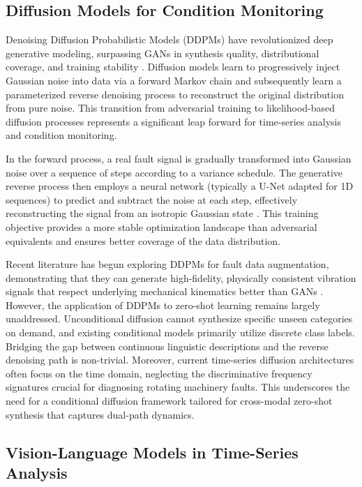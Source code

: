 \subsection{Diffusion Models for Condition Monitoring}

Denoising Diffusion Probabilistic Models (DDPMs) have revolutionized deep generative modeling, surpassing GANs in synthesis quality, distributional coverage, and training stability \cite{ho2020denoising}. Diffusion models learn to progressively inject Gaussian noise into data via a forward Markov chain and subsequently learn a parameterized reverse denoising process to reconstruct the original distribution from pure noise. This transition from adversarial training to likelihood-based diffusion processes represents a significant leap forward for time-series analysis and condition monitoring.

In the forward process, a real fault signal is gradually transformed into Gaussian noise over a sequence of steps according to a variance schedule. The generative reverse process then employs a neural network (typically a U-Net adapted for 1D sequences) to predict and subtract the noise at each step, effectively reconstructing the signal from an isotropic Gaussian state \cite{he2016deep,ho2020denoising}. This training objective provides a more stable optimization landscape than adversarial equivalents and ensures better coverage of the data distribution.

Recent literature has begun exploring DDPMs for fault data augmentation, demonstrating that they can generate high-fidelity, physically consistent vibration signals that respect underlying mechanical kinematics better than GANs \cite{fan2025lightweight,yang2024novel}. However, the application of DDPMs to zero-shot learning remains largely unaddressed. Unconditional diffusion cannot synthesize specific unseen categories on demand, and existing conditional models primarily utilize discrete class labels. Bridging the gap between continuous linguistic descriptions and the reverse denoising path is non-trivial. Moreover, current time-series diffusion architectures often focus on the time domain, neglecting the discriminative frequency signatures crucial for diagnosing rotating machinery faults. This underscores the need for a conditional diffusion framework tailored for cross-modal zero-shot synthesis that captures dual-path dynamics.

\subsection{Vision-Language Models in Time-Series Analysis}

